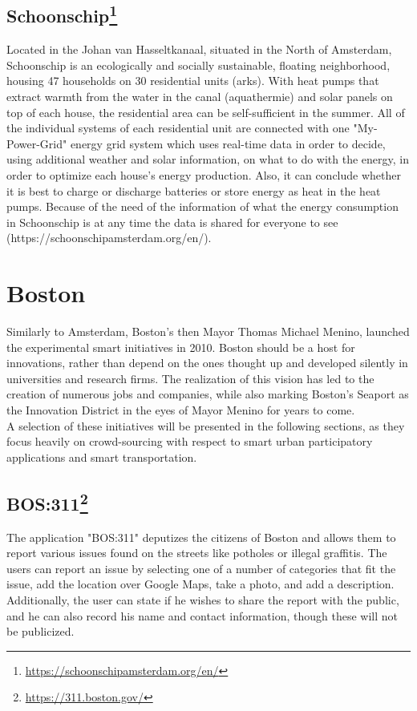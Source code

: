 \documentclass[a4paper,12pt]{report}
\begin{document}
		\subsection[Schoonschip]{Schoonschip\footnote{\url{https://schoonschipamsterdam.org/en/}}} \label{Schoonschipp}
		\startsubsection
			Located in the Johan van Hasseltkanaal, situated in the North of Amsterdam, Schoonschip is an ecologically and socially sustainable, floating neighborhood, housing 47 households on 30 residential units (arks). 
			With heat pumps that extract warmth from the water in the canal (aquathermie) and solar panels on top of each house, the residential area can be self-sufficient in the summer. 
			All of the individual systems of each residential unit are connected with one "My-Power-Grid" energy grid system which uses real-time data in order to decide, using additional weather and solar information, on what to do with the energy, in order to optimize each house's energy production. 
			Also, it can conclude whether it is best to charge or discharge batteries or store energy as heat in the heat pumps. Because of the need of the information of what the energy consumption in Schoonschip is at any time the data is shared for everyone to see (https://schoonschipamsterdam.org/en/).
		\closesection
	\closesection
	
	\section[Boston]{Boston \cite{SmartCityBoston}}
	\startsection
		Similarly to Amsterdam, Boston's then Mayor Thomas Michael Menino, launched the experimental smart initiatives in 2010. 
		Boston should be a host for innovations, rather than depend on the ones thought up and developed silently in universities and research firms. 
		The realization of this vision has led to the creation of numerous jobs and companies, while also marking Boston's Seaport as the Innovation District in the eyes of Mayor Menino for years to come.\\
		A selection of these initiatives will be presented in the following sections, as they focus heavily on crowd-sourcing with respect to smart urban participatory applications and smart transportation.
		
		\subsection[BOS:311]{BOS:311\footnote{\url{https://311.boston.gov/}}}
		\startsubsection
			The application "BOS:311" deputizes the citizens of Boston and allows them to report various issues found on the streets like potholes or illegal graffitis. 
			The users can report an issue by selecting one of a number of categories that fit the issue, add the location over Google Maps, take a photo, and add a description. 
			Additionally, the user can state if he wishes to share the report with the public, and he can also record his name and contact information, though these will not be publicized. 
		\closesection		
		
\end{document}
